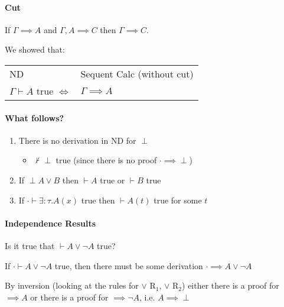 \documentclass[12 pt]{article}
\begin{document}
         \DP
         \DP
         \paragraph{Cut} If $\Gamma \implies A$ and $\Gamma, A
         \implies C$ then $\Gamma \implies C$.

         We showed that:
         \\
         \begin{tabular}{l l }
           ND & Sequent Calc (without cut)
           \\ $\Gamma \vdash A$ true $\iff$ & $\Gamma \implies A$
         \end{tabular}

         \paragraph{What follows?}
         \begin{enumerate}
         \item There is no derivation in ND for $\perp$
           \begin{itemize}
           \item $\nvdash \perp$ true (since there is no proof $\cdot
             \implies \perp$)
           \end{itemize}
         \item If $\perp A \lor B$ then $\vdash A$ true or $\vdash B$
           true
         \item If $\cdot \vdash \exists: \tau. A(x)$ true then $\vdash
           A(t)$ true for some $t$
         \end{enumerate}
         \paragraph{Independence Results}
         Is it true that $\vdash A \lor \neg A$ true?

         If $\cdot \vdash A \lor \neg A$ true, then there must be some
         derivation $\cdot \implies A \lor \neg A$

         By inversion (looking at the rules for $\lor$ R$_1$, $\lor$
         R$_2$) either there is a proof for $\implies A$ or there is a
         proof for $\implies \neg A$, i.e. $A \implies \perp$
\end{document}
